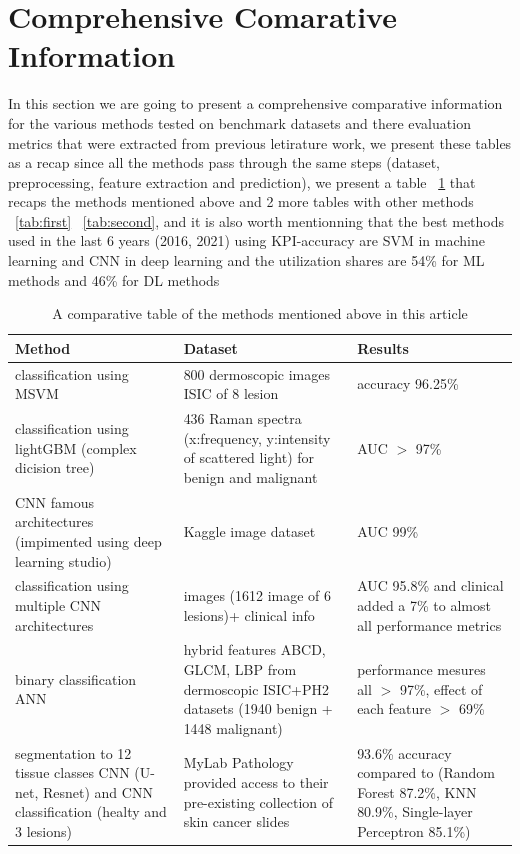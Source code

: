 \section{Comprehensive Comarative Information}
In this section we are going to present a comprehensive comparative information for the various methods tested on benchmark datasets and there evaluation metrics that were extracted from previous letirature work, we present these tables as a recap since all the methods pass through the same steps (dataset, preprocessing, feature extraction and prediction), we present a table ~\ref{tab:outable} that recaps the methods  mentioned above and 2 more tables with other methods ~\ref{tab:first} ~\ref{tab:second}, and it is also worth mentionning that the best methods used in the last 6 years (2016, 2021) using KPI-accuracy are SVM in machine learning and CNN in deep learning and the utilization shares are 54\% for ML methods and 46\% for DL methods ~\cite{Painuli2022}


\begin{table}[htbp]
    \begin{center}
        \begin{tabular}{p{3cm}|p{3cm}|p{6cm}}
        \hline 
        Method & Dataset & Results  \\ 
        \hline 
        classification using MSVM & 800 dermoscopic images ISIC of 8 lesion &  accuracy 96.25\% \\ 
        \hline 
        classification using lightGBM (complex dicision tree) & 436 Raman spectra (x:frequency, y:intensity of scattered light) for benign and malignant & AUC $>$ 97\%  \\ 
        \hline 
        CNN famous architectures (impimented using deep learning studio) & Kaggle image dataset &   AUC 99\% \\ 
        \hline 
        classification using multiple CNN architectures & images (1612 image of 6 lesions)+ clinical info &  AUC 95.8\% and clinical added a 7\% to almost all performance metrics \\ 
        \hline 
        binary classification ANN & hybrid features ABCD, GLCM, LBP from dermoscopic  ISIC+PH2 datasets (1940 benign + 1448 malignant) & performance mesures all $>$ 97\%, effect of each feature $>$ 69\%  \\ 
        \hline 
        segmentation to 12 tissue classes CNN (U-net, Resnet) and CNN classification (healty and 3 lesions) & MyLab Pathology provided access to their pre-existing collection of skin cancer slides & 93.6\% accuracy compared to (Random Forest 87.2\%, KNN 80.9\%, Single-layer Perceptron 85.1\%) \\ 
        \hline 
        \end{tabular} 
    \end{center}
\caption{A comparative table of the methods mentioned above in this article}
\label{tab:outable}
\end{table}

